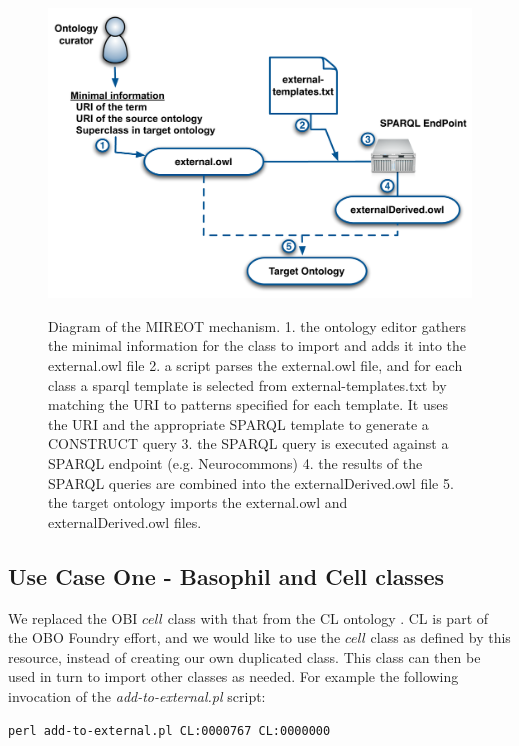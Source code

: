 \documentclass{ao2e}%
\begin{document}
\begin{figure}[t]
\centering
{
\includegraphics[width=.9\linewidth]{./figs/mechanism2.pdf}
}
\caption{Diagram of the MIREOT mechanism.
1. the ontology editor gathers the minimal information for the class to import and adds it into the external.owl file
2. a script parses the external.owl file, and for each class a sparql template is selected from external-templates.txt by matching the URI to patterns specified for each template. It uses the URI and the appropriate SPARQL template to generate a CONSTRUCT query
3. the SPARQL query is executed against a SPARQL endpoint (e.g. Neurocommons)
4. the results of the SPARQL queries are combined into the externalDerived.owl file
5. the target ontology imports the external.owl and externalDerived.owl files.
}
\label{fig:mechanism2}
\end{figure}




\subsection*{Use Case One - Basophil and Cell classes}

We replaced the \ac{OBI} $cell$ class with that from the \ac{CL} ontology \cite{CL}. 
\ac{CL} is part of the \ac{OBO} Foundry effort, and we would like to use the $cell$ class as defined by this resource, instead of creating our own duplicated class.
This class can then be used in turn to import other classes as needed.
For example the following invocation of the \emph{add-to-external.pl} script:

\begin{footnotesize}
\begin{verbatim}
perl add-to-external.pl CL:0000767 CL:0000000 
\end{verbatim}
\end{footnotesize}
\end{document}
